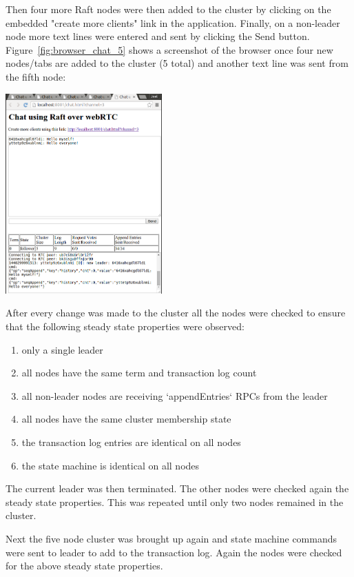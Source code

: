 \documentclass[9pt]{extarticle}
\begin{document}
\begin{multicols}{2}
Then four more Raft nodes were then added to the cluster by clicking
on the embedded "create more clients" link in the application.
Finally, on a non-leader node more text lines were entered and sent by
clicking the Send button. Figure~\ref{fig:browser_chat_5} shows
a screenshot of the browser once four new nodes/tabs are added to the
cluster (5 total) and another text line was sent from the fifth node:

\begin{center}
    \includegraphics[width=0.45\textwidth]{imgs/chat_5a.png}
    \label{fig:browser_chat_5}
\end{center}

After every change was made to the cluster all the nodes were checked
to ensure that the following steady state properties were observed:
\begin{enumerate}
\item only a single leader
\item all nodes have the same term and transaction log count
\item all non-leader nodes are receiving `appendEntries` RPCs from the leader
\item all nodes have the same cluster membership state
\item the transaction log entries are identical on all nodes
\item the state machine is identical on all nodes
\end{enumerate}

The current leader was then terminated. The other nodes were checked
again the steady state properties. This was repeated until only two
nodes remained in the cluster.

Next the five node cluster was brought up again and state machine
commands were sent to leader to add to the transaction log. Again the
nodes were checked for the above steady state properties.


\end{multicols}
\end{document}
